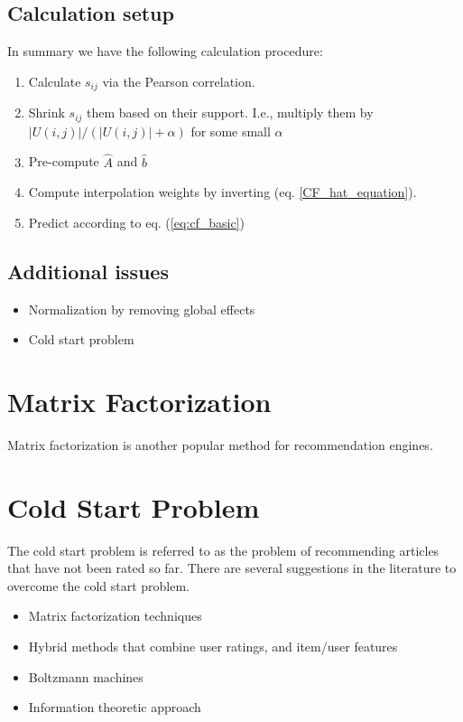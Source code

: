 \documentclass[10pt,a4paper]{article}
\begin{document}
\subsection{Calculation setup}
In summary we have the following calculation procedure:
\begin{enumerate}
\item Calculate $s_{ij}$ via the Pearson correlation. 
\item Shrink  $s_{ij}$ them based on their support. I.e., multiply them by
$\lvert U(i,j)\rvert / (\lvert U(i,j)\rvert + \alpha)$  for some small $\alpha$
\item Pre-compute $\hat A$ and $\hat b$
\item Compute interpolation weights by inverting (eq. \ref{CF_hat_equation}).
\item Predict according to eq. (\ref{eq:cf_basic})
\end{enumerate}
\subsection{Additional issues}
\begin{itemize}
\item Normalization by removing global effects
\item Cold start problem
\end{itemize}

\section{Matrix Factorization}
Matrix factorization is another popular method for recommendation engines.  \cite{Koren:2009:MFT, Rendle:2012:FML}

\section{Cold Start Problem}
The cold start problem is referred to as the problem of  recommending  articles that have not been rated so far. There are several suggestions in the literature to overcome the cold start problem.
\begin{itemize}
\item Matrix factorization techniques \cite{Zhou:2011:FMF, Koren:2009:MFT}
\item Hybrid methods that combine user ratings, and item/user features \cite{Park:2009:PPR}
\item Boltzmann machines \cite{Gunawardana:2009:UAB}
\item Information theoretic approach \cite{Rashid:2008:LPN}
\end{itemize}



\end{document}
